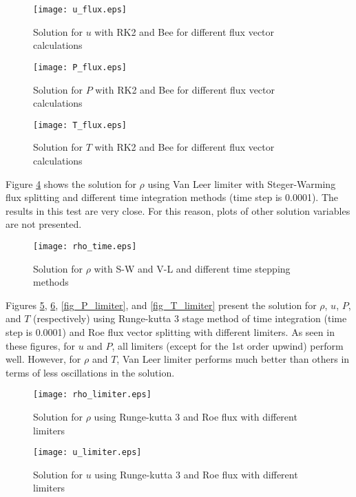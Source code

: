 \documentclass{article}
\begin{document}
\begin{figure}[H]
\centering
\texttt{[image: u\_flux.eps]}
\caption{Solution for $u$ with RK2 and Bee for different flux vector calculations}
\label{fig_u_flux}
\end{figure}

\begin{figure}[H]
\centering
\texttt{[image: P\_flux.eps]}
\caption{Solution for $P$ with RK2 and Bee for different flux vector calculations}
\label{fig_P_flux}
\end{figure}

\begin{figure}[H]
\centering
\texttt{[image: T\_flux.eps]}
\caption{Solution for $T$ with RK2 and Bee for different flux vector calculations}
\label{fig_T_flux}
\end{figure}

Figure \ref{fig_rho_time} shows the solution for $\rho$ using Van Leer limiter with Steger-Warming flux splitting and different time integration methods (time step is 0.0001). The results in this test are very close. For this reason, plots of other solution variables are not presented.

\begin{figure}[H]
\centering
\texttt{[image: rho\_time.eps]}
\caption{Solution for $\rho$ with S-W and V-L and different time stepping methods}
\label{fig_rho_time}
\end{figure}

Figures \ref{fig_rho_limiter}, \ref{fig_u_limiter}, \ref{fig_P_limiter}, and \ref{fig_T_limiter} present the solution for $\rho$, $u$, $P$, and $T$ (respectively) using Runge-kutta 3 stage method of time integration (time step is 0.0001) and Roe flux vector splitting with different limiters. As seen in these figures, for $u$ and $P$, all limiters (except for the 1st order upwind) perform well. However, for $\rho$ and $T$, Van Leer limiter performs much better than others in terms of less oscillations in the solution.

\begin{figure}[H]
\centering
\texttt{[image: rho\_limiter.eps]}
\caption{Solution for $\rho$ using Runge-kutta 3 and Roe flux with different limiters}
\label{fig_rho_limiter}
\end{figure}

\begin{figure}[H]
\centering
\texttt{[image: u\_limiter.eps]}
\caption{Solution for $u$ using Runge-kutta 3 and Roe flux with different limiters}
\label{fig_u_limiter}
\end{figure}
\end{document}
